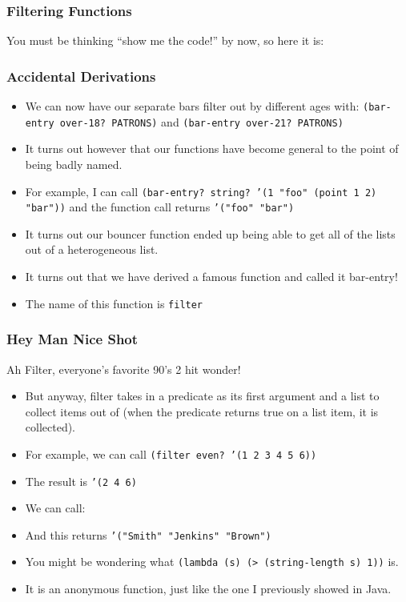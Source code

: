 \documentclass{beamer}
\begin{document}
\begin{frame}
  \frametitle{Filtering Functions}
  You must be thinking ``show me the code!'' by now, so here it is:
  \BarFilter
\end{frame}

\begin{frame}
  \frametitle{Accidental Derivations}
  \begin{itemize}
  \item<2-> We can now have our separate bars filter out by different ages
    with: \texttt{(bar-entry over-18? PATRONS)}
    and \texttt{(bar-entry over-21? PATRONS)}
  \item<3-> It turns out however that our functions have become general to
    the point of being badly named.
  \item<4-> For example, I can call \texttt{(bar-entry? string? '(1 "foo" (point 1 2) "bar"))} and the function call returns
    \texttt{'("foo" "bar")}
  \item<5-> It turns out our bouncer function ended up being able to get all of
    the lists out of a heterogeneous list.
  \item<6-> It turns out that we have derived a famous function and called it
    bar-entry!
  \item<7-> The name of this function is \texttt{filter}
  \end{itemize}
\end{frame}


\begin{frame}
  \frametitle{Hey Man Nice Shot}
  Ah Filter, everyone's favorite 90's 2 hit wonder!
  \begin{itemize}
  \item<2-> But anyway, filter takes in a predicate as its first argument
    and a list to collect items out of (when the predicate returns true on a list item, it is collected).
  \item<3-> For example, we can call \texttt{(filter even? '(1 2 3 4 5 6))}
  \item<4-> The result is \texttt{'(2 4 6)}
  \item<5-> We can call: \FilterString
  \item<6-> And this returns \texttt{'("Smith" "Jenkins" "Brown")}
  \item<7-> You might be wondering what \texttt{(lambda (s) (> (string-length s) 1))} is.
  \item<8-> It is an anonymous function, just like the one I previously
    showed in Java.
  \end{itemize}
\end{frame}
\end{document}
